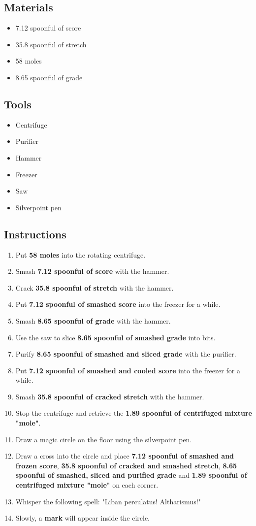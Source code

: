 \documentclass{article}
\begin{document}
\subsection{Materials}\begin{itemize}
\item 
7.12 spoonful of score
\item 
35.8 spoonful of stretch
\item 
58 moles
\item 
8.65 spoonful of grade
\end{itemize}
\subsection{Tools}\begin{itemize}
\item 
Centrifuge
\item 
Purifier
\item 
Hammer
\item 
Freezer
\item 
Saw
\item 
Silverpoint pen
\end{itemize}
\subsection{Instructions}\begin{enumerate}
\item 
Put \textbf{58 moles} into the rotating centrifuge.
\item 
Smash \textbf{7.12 spoonful of score} with the hammer.
\item 
Crack \textbf{35.8 spoonful of stretch} with the hammer.
\item 
Put \textbf{7.12 spoonful of smashed score} into the freezer for a while.
\item 
Smash \textbf{8.65 spoonful of grade} with the hammer.
\item 
Use the saw to slice \textbf{8.65 spoonful of smashed grade} into bits.
\item 
Purify \textbf{8.65 spoonful of smashed and sliced grade} with the purifier.
\item 
Put \textbf{7.12 spoonful of smashed and cooled score} into the freezer for a while.
\item 
Smash \textbf{35.8 spoonful of cracked stretch} with the hammer.
\item 
Stop the centrifuge and retrieve the \textbf{1.89 spoonful of centrifuged mixture "mole"}.
\item 
Draw a magic circle on the floor using the silverpoint pen.
\item 
Draw a cross into the circle and place \textbf{7.12 spoonful of smashed and frozen score}, \textbf{35.8 spoonful of cracked and smashed stretch}, \textbf{8.65 spoonful of smashed, sliced and purified grade} and \textbf{1.89 spoonful of centrifuged mixture "mole"} on each corner.
\item 
Whisper the following spell: "Liban perculatus! Altharismus!"
\item 
Slowly, a \textbf{mark} will appear inside the circle.
\end{enumerate}
\newpage
\end{document}
